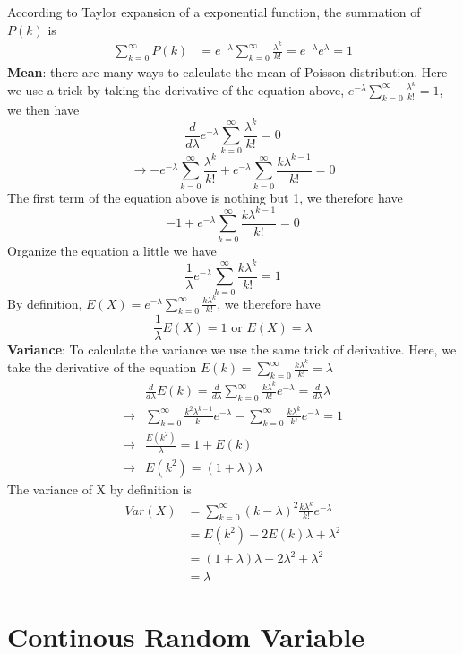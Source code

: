 \documentclass[12pt, oneside]{article}
\begin{document}
According to Taylor expansion of a exponential function, the summation of $P(k)$ is 
\begin{align*}
\sum\limits_{k=0}^{\infty} P(k)&=e^{-\lambda}\sum\limits_{k=0}^{\infty}\frac{\lambda^k}{k!}=e^{-\lambda}e^{\lambda}=1
\end{align*}
\textbf{Mean}: there are many ways to calculate the mean of Poisson distribution. Here we use a trick by taking the derivative of the equation above, $e^{-\lambda}\sum\limits_{k=0}^{\infty}\frac{\lambda^k}{k!}=1$, we then have 
$$\frac{d}{d\lambda}e^{-\lambda}\sum\limits_{k=0}^{\infty}\frac{\lambda^k}{k!}=0$$ 
$$\rightarrow-e^{-\lambda}\sum\limits_{k=0}^{\infty}\frac{\lambda^k}{k!}+e^{-\lambda}\sum\limits_{k=0}^{\infty}\frac{k\lambda^{k-1}}{k!}=0$$
The first term of the equation above is nothing but 1, we therefore have
$$-1+e^{-\lambda}\sum\limits_{k=0}^{\infty}\frac{k\lambda^{k-1}}{k!}=0$$
Organize the equation a little we have
$$\frac{1}{\lambda}e^{-\lambda}\sum\limits_{k=0}^{\infty}\frac{k\lambda^{k}}{k!}=1$$
By definition,  $E(X)=e^{-\lambda}\sum\limits_{k=0}^{\infty}\frac{k\lambda^{k}}{k!}$, we therefore have
$$\frac{1}{\lambda}E(X)=1 \text{ or } E(X)=\lambda$$ 
\textbf{Variance}: To calculate the variance we use the same trick of derivative. Here, we take the derivative of the equation $E(k)=\sum\limits_{k=0}^{\infty}\frac{k\lambda^{k}}{k!}=\lambda$
\begin{align*}
&\frac{d}{d\lambda}E(k)=\frac{d}{d\lambda}\sum\limits_{k=0}^{\infty}\frac{k\lambda^{k}}{k!}e^{-\lambda}=\frac{d}{d\lambda}\lambda\\
\rightarrow&\sum\limits_{k=0}^{\infty}\frac{k^2\lambda^{k-1}}{k!}e^{-\lambda}-\sum\limits_{k=0}^{\infty}\frac{k\lambda^{k}}{k!}e^{-\lambda}=1\\
\rightarrow&\frac{E(k^2)}{\lambda}=1+E(k)\\
\rightarrow&E(k^2)=(1+\lambda)\lambda
\end{align*}
The variance of X by definition is 
\begin{align*}
Var(X)&=\sum\limits_{k=0}^{\infty}(k-\lambda)^2\frac{k\lambda^{k}}{k!}e^{-\lambda}\\
&=E(k^2)-2E(k)\lambda+\lambda^2\\
&=(1+\lambda)\lambda-2\lambda^2+\lambda^2\\
&=\lambda
\end{align*}

\section{Continous Random Variable}
\end{document}
